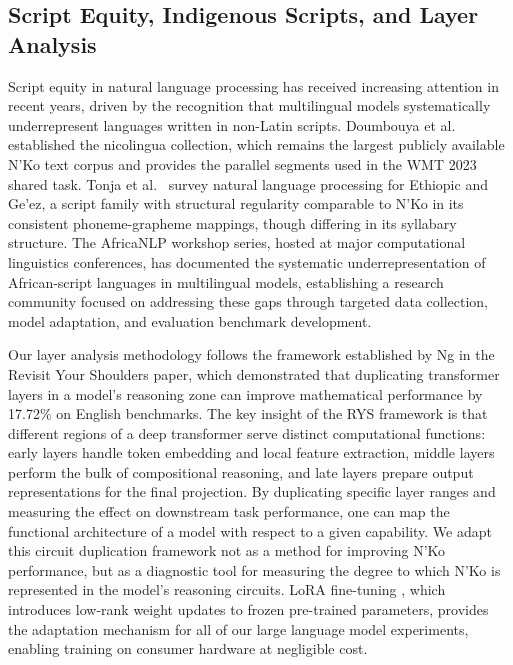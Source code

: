 \documentclass[11pt]{article}
\newcommand{\nko}{N'Ko}
\begin{document}
\subsection{Script Equity, Indigenous Scripts, and Layer Analysis}
\label{sec:related_script}

Script equity in natural language processing has received increasing attention in recent years, driven by the recognition that multilingual models systematically underrepresent languages written in non-Latin scripts. Doumbouya et al.\ \cite{doumbouya2021} established the nicolingua collection, which remains the largest publicly available \nko{} text corpus and provides the parallel segments used in the WMT 2023 shared task. Tonja et al.\ \cite{tonja2023natural} survey natural language processing for Ethiopic and Ge'ez, a script family with structural regularity comparable to \nko{} in its consistent phoneme-grapheme mappings, though differing in its syllabary structure. The AfricaNLP workshop series, hosted at major computational linguistics conferences, has documented the systematic underrepresentation of African-script languages in multilingual models, establishing a research community focused on addressing these gaps through targeted data collection, model adaptation, and evaluation benchmark development.

Our layer analysis methodology follows the framework established by Ng \cite{ng2024rys} in the Revisit Your Shoulders paper, which demonstrated that duplicating transformer layers in a model's reasoning zone can improve mathematical performance by 17.72\% on English benchmarks. The key insight of the RYS framework is that different regions of a deep transformer serve distinct computational functions: early layers handle token embedding and local feature extraction, middle layers perform the bulk of compositional reasoning, and late layers prepare output representations for the final projection. By duplicating specific layer ranges and measuring the effect on downstream task performance, one can map the functional architecture of a model with respect to a given capability. We adapt this circuit duplication framework not as a method for improving \nko{} performance, but as a diagnostic tool for measuring the degree to which \nko{} is represented in the model's reasoning circuits. LoRA fine-tuning \cite{hu2022lora}, which introduces low-rank weight updates to frozen pre-trained parameters, provides the adaptation mechanism for all of our large language model experiments, enabling training on consumer hardware at negligible cost.
\end{document}
